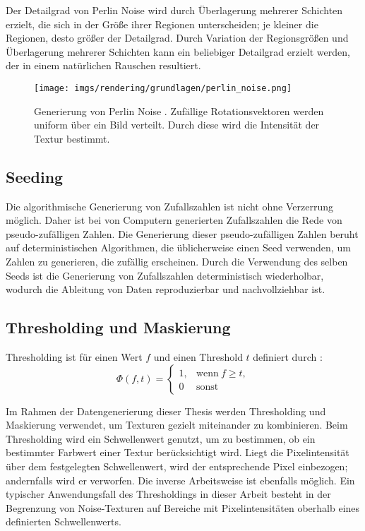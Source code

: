 Der Detailgrad von Perlin Noise wird durch Überlagerung mehrerer Schichten erzielt, die sich in der Größe ihrer Regionen unterscheiden; je kleiner die Regionen, desto größer der Detailgrad. Durch Variation der Regionsgrößen und Überlagerung mehrerer Schichten kann ein beliebiger Detailgrad erzielt werden, der in einem natürlichen Rauschen resultiert.

\begin{figure}
    \centering
    \texttt{[image: imgs/rendering/grundlagen/perlin\_noise.png]}
    \caption{Generierung von Perlin Noise \cite{perlin_noise_img}. Zufällige Rotationsvektoren werden uniform über ein Bild verteilt. Durch diese wird die Intensität der Textur bestimmt.}
    \label{img:perlin_noise_generation}
\end{figure}

\subsection{Seeding}
\label{sec:seeding}

Die algorithmische Generierung von Zufallszahlen ist nicht ohne Verzerrung möglich. Daher ist bei von Computern generierten Zufallszahlen die Rede von pseudo-zufälligen Zahlen. Die Generierung dieser pseudo-zufälligen Zahlen beruht auf deterministischen Algorithmen, die üblicherweise einen Seed verwenden, um Zahlen zu generieren, die zufällig erscheinen. Durch die Verwendung des selben Seeds ist die Generierung von Zufallszahlen deterministisch wiederholbar, wodurch die Ableitung von Daten reproduzierbar und nachvollziehbar ist.

\vspace*{0.1cm}

\subsection{Thresholding und Maskierung}
\label{sec:thresholding_maskierung}

Thresholding ist für einen Wert $f$ und einen Threshold $t$ definiert durch \cite{cv_general}:
\[\Phi(f, t) = \begin{cases}
        1, & \text{wenn}~f \geq t, \\
        0  & \text{sonst}
    \end{cases}\]

Im Rahmen der Datengenerierung dieser Thesis werden Thresholding und Maskierung verwendet, um Texturen gezielt miteinander zu kombinieren. Beim Thresholding wird ein Schwellenwert genutzt, um zu bestimmen, ob ein bestimmter Farbwert einer Textur berücksichtigt wird. Liegt die Pixelintensität über dem festgelegten Schwellenwert, wird der entsprechende Pixel einbezogen; andernfalls wird er verworfen. Die inverse Arbeitsweise ist ebenfalls möglich. Ein typischer Anwendungsfall des Thresholdings in dieser Arbeit besteht in der Begrenzung von Noise-Texturen auf Bereiche mit Pixelintensitäten oberhalb eines definierten Schwellenwerts.


